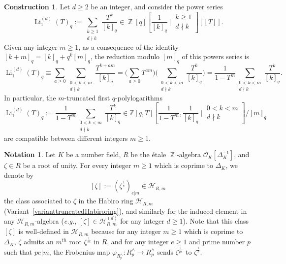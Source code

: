 \documentclass[10pt,twoside]{scrarticle}
\theoremstyle{definition}
\newtheorem{construction}[theorem]{Construction}
\newtheorem{notation}[theorem]{Notation}
\DeclareMathOperator{\Z}{\mathbb{Z}}
\newcommand{\Li}{\operatorname{Li}}
\renewcommand{\ge}{\geqslant}
\numberwithin{equation}{theorem}
\begin{document}
\begin{construction}\label{constructionfirstpolylogarithmformal}
    Let $d \ge 2$ be an integer, and consider the power series
    $$\Li_1^{(d)}(T)_q := \sum_{\substack{k \ge 1 \\ d \nmid k}} \frac{T^k}{[k]_q} \in \Z[q]\left[\frac{1}{[k]_q}~\bigg|~\substack{k \ge 1 \\ d \nmid k}\right][\![T]\!].$$
    Given any integer $m \ge 1$, as a consequence of the identity $[k+m]_q = [k]_q + q^k[m]_q$, the reduction modulo $[m]_q$ of this powers series is
    $$\Li_1^{(d)}(T)_q \equiv \sum_{a \ge 0} \sum_{\substack{0 < k < m \\ d \nmid k}} \frac{T^{k+am}}{[k]_q} = \Big(\sum_{a \ge 0} T^{am}\Big) \Big( \sum_{\substack{0 < k < m \\ d \nmid k}} \frac{T^k}{[k]_q} \Big) = \frac{1}{1-T^m} \sum_{\substack{0 < k < m \\ d \nmid k}} \frac{T^k}{[k]_q}.$$
    In particular, the $m$-truncated first $q$-polylogarithms
    $$\Li_1^{(d)}(T)_q := \frac{1}{1-T^m} \sum_{\substack{0 < k < m \\ d \nmid k}} \frac{T^k}{[k]_q} \in \mathbb{Z}[q,T]\left[\frac{1}{1-T^m},\frac{1}{[k]_q}~\bigg|~\substack{0<k<m \\ d\nmid k}\right]/[m]_q$$
    are compatible between different integers $m \ge 1$.
\end{construction}

\begin{notation}\label{notationclassofzeta}
    Let $K$ be a number field, $R$ be the étale $\Z$-algebra $\mathcal{O}_K[\Delta_K^{-1}]$, 
    and $\zeta \in R$ be a root of unity. For every integer $m \ge 1$ which is coprime to $\Delta_K$, we denote by
    $$[\zeta] := (\zeta^{\frac{1}{e}})_{e|m} \in \mathcal{H}_{R,m}$$
    the class associated to $\zeta$ in the Habiro ring $\mathcal{H}_{R,m}$ (Variant~\ref{varianttruncatedHabiroring}),
    and similarly for the induced element in any $\mathcal{H}_{R,m}$-algebra (\emph{e.g.}, $[\zeta] \in \mathcal{H}_{R,m}^{(d)}$ for any integer $d \ge 1$). Note that this class $[\zeta]$ is well-defined in $\mathcal{H}_{R,m}$ because for any integer $m \ge 1$ which is coprime to $\Delta_K$, $\zeta$ admits an $m^{th}$ root $\zeta^{\frac{1}{m}}$ in $R$, and for any integer $e \ge 1$ and prime number $p$ such that $pe|m$, the Frobenius map $\varphi_{R^\wedge_p} : R^\wedge_p \rightarrow R^\wedge_p$ sends $\zeta^{\frac{1}{pe}}$ to $\zeta^{\frac{1}{e}}$.
\end{notation}
\end{document}
